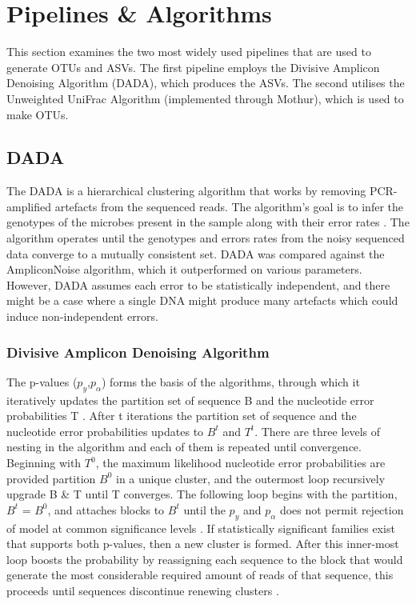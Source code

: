 \chapter{Pipelines \& Algorithms}
 \setcounter{page}{13}

This section examines the two most widely used pipelines that are used to generate OTUs and ASVs. The first pipeline employs the Divisive Amplicon Denoising Algorithm (DADA), which produces the ASVs. The second utilises the Unweighted UniFrac Algorithm (implemented through Mothur), which is used to make OTUs.

\section{DADA}
The DADA is a hierarchical clustering algorithm that works by removing PCR-amplified artefacts from the sequenced reads. The algorithm's goal is to infer the genotypes of the microbes present in the sample along with their error rates \cite{ref17}. The algorithm operates until the genotypes and errors rates from the noisy sequenced data converge to a mutually consistent set. DADA was compared against the AmpliconNoise algorithm, which it outperformed on various parameters. However, DADA assumes each error to be statistically independent, and there might be a case where a single DNA might produce many artefacts which could induce non-independent errors.\newline

\subsection*{Divisive Amplicon Denoising Algorithm}
The p-values ($p_{y}$,$p_{\alpha}$) forms the basis of the algorithms, through which it iteratively updates the partition set of sequence B and the nucleotide error probabilities T \cite{ref17}. After t iterations the partition set of sequence and the nucleotide error probabilities updates to $B^{t}$ and $T^{t}$. There are three levels of nesting in the algorithm and each of them is repeated until convergence. Beginning with $T^{0}$, the maximum likelihood nucleotide error probabilities are provided partition $B^{0}$ in a unique cluster, and the outermost loop recursively upgrade B \& T until T converges. The following loop begins with the partition, $B^{t}$ = $B^{0}$, and attaches blocks to $B^{t}$ until the $p_{y}$ and $p_{\alpha}$ does not permit rejection of model at common significance levels \cite{ref17}. If statistically significant families exist that supports both p-values, then a new cluster is formed. After this inner-most loop boosts the probability by reassigning each sequence to the block that would generate the most considerable required amount of reads of that sequence, this proceeds until sequences discontinue renewing clusters \cite{ref17}.\newline

